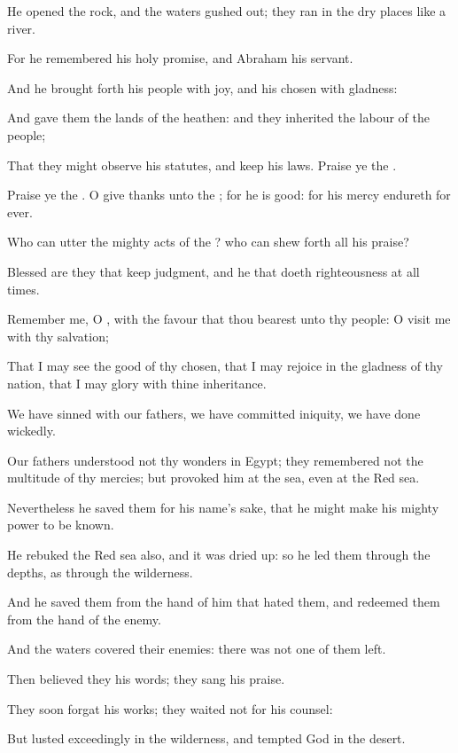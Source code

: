 \Verse He opened the rock, and the waters gushed out; they ran in the dry places like a river.

\Verse For he remembered his holy promise, and Abraham his servant.

\Verse And he brought forth his people with joy, and his chosen with gladness:

\Verse And gave them the lands of the heathen: and they inherited the labour of the people;

\Verse That they might observe his statutes, and keep his laws. Praise ye the \LORD.




\Chapter
\Verse Praise ye the \LORD. O give thanks unto the \LORD; for he is good: for his mercy endureth for ever.

\Verse Who can utter the mighty acts of the \LORD? who can shew forth all his praise?

\Verse Blessed are they that keep judgment, and he that doeth righteousness at all times.

\Verse Remember me, O \LORD, with the favour that thou bearest unto thy people: O visit me with thy salvation;

\Verse That I may see the good of thy chosen, that I may rejoice in the gladness of thy nation, that I may glory with thine inheritance.

\Verse We have sinned with our fathers, we have committed iniquity, we have done wickedly.

\Verse Our fathers understood not thy wonders in Egypt; they remembered not the multitude of thy mercies; but provoked him at the sea, even at the Red sea.

\Verse Nevertheless he saved them for his name's sake, that he might make his mighty power to be known.

\Verse He rebuked the Red sea also, and it was dried up: so he led them through the depths, as through the wilderness.

\Verse And he saved them from the hand of him that hated them, and redeemed them from the hand of the enemy.

\Verse And the waters covered their enemies: there was not one of them left.

\Verse Then believed they his words; they sang his praise.

\Verse They soon forgat his works; they waited not for his counsel:

\Verse But lusted exceedingly in the wilderness, and tempted God in the desert.

